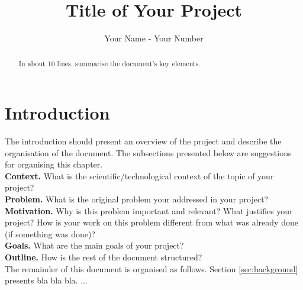 \documentclass[sigplan]{acmart}
\begin{document}
\title{Title of Your Project} 

\author{Your Name - Your Number}


\begin{abstract}
In about 10 lines, summarise the document's key elements.
\end{abstract}



\pagestyle{plain} %

\maketitle
\section{Introduction}

The introduction should present an overview of the project and describe the organisation of the document. The subsections presented below are suggestions for organising this chapter. \\

\noindent\textbf{Context.} What is the scientific/technological context of the topic of your project? \\

\noindent \textbf{Problem.} What is the original problem your addressed in your project?\\

\noindent\textbf{Motivation.} Why is this problem important and relevant? What justifies your project? How is your work on this problem different from what was already done (if something was done)? \\

\noindent\textbf{Goals.} What are the main goals of your project?\\

\noindent\textbf{Outline.} How is the rest of the document structured? \\The remainder of this document is organised as follows. Section \ref{sec:background} presents bla bla bla. ...
\end{document}
